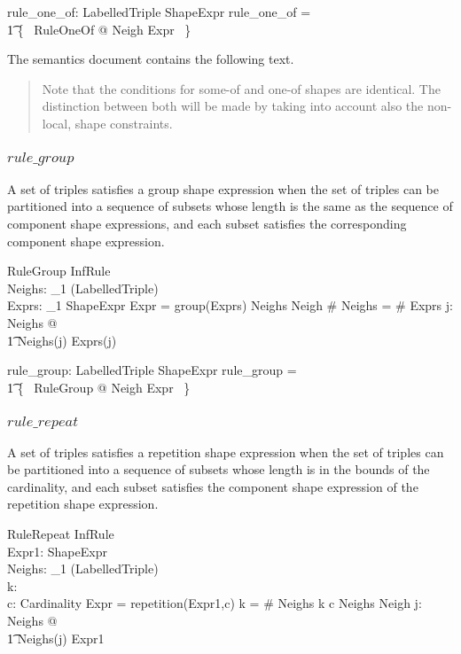 \documentclass{article}
\begin{document}
\begin{axdef}
	rule\_one\_of: \finset LabelledTriple \rel ShapeExpr
\where
	rule\_one\_of = \\
\t1		\{~ RuleOneOf @ Neigh \mapsto Expr ~\}
\end{axdef}

The semantics document contains the following text.
\begin{quote}
Note that the conditions for some-of and one-of shapes are identical. 
The distinction between both will be made by taking into account also the non-local, shape constraints.
\end{quote}

\subsubsection{$rule\_group$}
A set of triples satisfies a group shape expression when the set of triples can be partitioned into a sequence of subsets whose length
is the same as the sequence of component shape expressions, and each subset satisfies the corresponding component shape expression.
\begin{schema}{RuleGroup}
	InfRule \\
	Neighs: \seq_1 (\finset LabelledTriple) \\
	Exprs: \seq_1 ShapeExpr
\where
	Expr = group(Exprs)
\also
	Neighs \partition Neigh
\also
	\# Neighs = \# Exprs
\also
	\forall j: \dom Neighs @ \\
\t1		Neighs(j)  Exprs(j)
\end{schema}

\begin{axdef}
	rule\_group: \finset LabelledTriple \rel ShapeExpr
\where
	rule\_group = \\
\t1		\{~ RuleGroup @ Neigh \mapsto Expr ~\}
\end{axdef}

\subsubsection{$rule\_repeat$}
A set of triples satisfies a repetition shape expression when the set of triples can be partitioned into a sequence of subsets whose length is
in the bounds of the cardinality, and each subset satisfies the component shape expression of the repetition shape expression.
\begin{schema}{RuleRepeat}
	InfRule \\
	Expr1: ShapeExpr \\
	Neighs: \seq_1 (\finset LabelledTriple) \\
	k: \nat \\
	c: Cardinality
\where
	Expr = repetition(Expr1,c)
\also
	k = \# Neighs
\also
	k  c
\also
	Neighs \partition Neigh
\also
	\forall j: \dom Neighs @ \\
\t1		Neighs(j)  Expr1
\end{schema}
\end{document}
